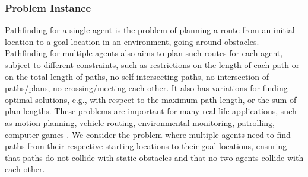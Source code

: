 \documentclass[a4paper, titlepage]{article}
\begin{document}
\subsubsection{Problem Instance}
Pathfinding for a single agent is the problem of planning a 
route from an initial
location to a goal location in an environment, going around 
obstacles. 
Pathfinding for multiple agents also aims to plan such 
routes for each agent, 
subject to different constraints, such as restrictions on 
the length of each path 
or on the total length of paths, no self-intersecting 
paths, no intersection of 
paths/plans, no crossing/meeting each other.  It also has 
variations for finding optimal solutions, e.g., with 
respect 
to the maximum path length, or the sum of plan lengths. 
These problems are important
for many real-life applications, such as motion planning, 
vehicle routing, environmental monitoring, patrolling, 
computer games \cite{multipleAgents}. We consider the 
problem 
where multiple agents need to find paths 
from their respective starting locations to their goal 
locations, ensuring that 
paths do not collide with static obstacles and that no two 
agents collide with 
each other. 
\end{document}
